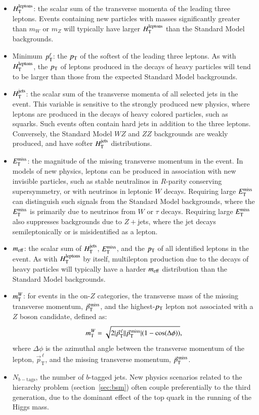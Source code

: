 \begin{itemize}
	\item $H_{\mathrm{T}}^{\mathrm{leptons}}$: the scalar sum of the transverse momenta of the leading three leptons. Events containing new particles with masses significantly greater than $m_W$ or $m_Z$ will typically have larger $H_{\mathrm{T}}^{\mathrm{leptons}}$ than the Standard Model backgrounds.
	\item Minimum $p_{\text{T}}^{\ell}$: the $p_{\text{T}}$ of the softest of the leading three leptons. As with $H_{\mathrm{T}}^{\mathrm{leptons}}$, the $p_{\text{T}}$ of leptons produced in the decays of heavy particles will tend to be larger than those from the expected Standard Model backgrounds.
	\item $H_{\mathrm{T}}^{\mathrm{jets}}$: the scalar sum of the transverse momenta of all selected jets in the event. This variable is sensitive to the strongly produced new physics, where leptons are produced in the decays of heavy colored particles, such as squarks. Such events often contain hard jets in addition to the three leptons. Conversely, the Standard Model $WZ$ and $ZZ$ backgrounds are weakly produced, and have softer $H_{\mathrm{T}}^{\mathrm{jets}}$ distributions.
	\item $E_{\text{T}}^{\text{miss}}$: the magnitude of the missing transverse momentum in the event. In models of new physics, leptons can be produced in association with new invisible particles, such as stable neutralinos in $R$-parity conserving supersymmetry, or with neutrinos in leptonic $W$ decays. Requiring large $E_{\text{T}}^{\text{miss}}$ can distinguish such signals from the Standard Model backgrounds, where the $E_{\text{T}}^{\text{miss}}$ is primarily due to neutrinos from $W$ or $\tau$ decays. Requiring large $E_{\text{T}}^{\text{miss}}$ also suppresses backgrounds due to $Z+$jets, where the jet decays semileptonically or is misidentified as a lepton. 
	\item $m_{\mathrm{eff}}$: the scalar sum of $H_{\mathrm{T}}^{\mathrm{jets}}$, $E_{\text{T}}^{\text{miss}}$, and the $p_{\text{T}}$ of all identified leptons in the event. As with $H_{\mathrm{T}}^{\mathrm{leptons}}$ by itself, multilepton production due to the decays of heavy particles will typically have a harder $m_{\mathrm{eff}}$ distribution than the Standard Model backgrounds.
	\item $m_{\mathrm{T}}^W$: for events in the on-$Z$ categories, the transverse mass of the missing transverse momentum, $\vec{p}_{\mathrm{T}}^{\,\mathrm{miss}}$, and the highest-$p_{\text{T}}$ lepton not associated with a $Z$ boson candidate, defined as:
	\begin{equation}
		m_{\mathrm{T}}^W = \sqrt{2 |\vec{p}_{\mathrm{T}}^{\,\ell}||\vec{p}_{\mathrm{T}}^{\,\mathrm{miss}}|(1-\cos(\Delta\phi))},
	\end{equation}
	where $\Delta \phi$ is the azimuthal angle between the transverse momentum of the lepton, $\vec{p}_{\mathrm{T}}^{\,\ell}$, and the missing transverse momentum, $\vec{p}_{\mathrm{T}}^{\,\mathrm{miss}}$. 
	\item $N_{b-\mathrm{tags}}$, the number of $b$-tagged jets. New physics scenarios related to the hierarchy problem (section~\ref{sec:bsm}) often couple preferentially to the third generation, due to the dominant effect of the top quark in the running of the Higgs mass. 
\end{itemize}

